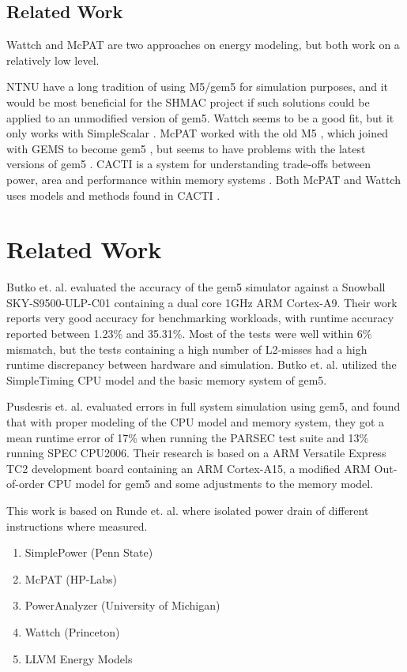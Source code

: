 
\subsection{Related Work}

Wattch \cite{brooks2000wattch} and McPAT \cite{hpmcpat,li2013mcpat} are two
approaches on energy modeling, but both work on a relatively low level.

NTNU have a long tradition of using M5/gem5 for simulation purposes, and it
would be most beneficial for the SHMAC project if such solutions could be
applied to an unmodified version of gem5. Wattch seems to be a good fit, but it
only works with SimpleScalar \cite{wattchanalysis}. McPAT worked with the old M5
\cite{m5mcpatparser}, which joined with GEMS to become gem5 \cite{gem5hipeac},
but seems to have problems with the latest versions of gem5
\cite{mcpatgem5problems}. CACTI is a system for understanding trade-offs between
power, area and performance within memory systems
\cite{hpcacti,muralimanohar2010memory}. Both McPAT and Wattch uses models and
methods found in CACTI \cite{li2009mcpat}.




\section{Related Work}

Butko et. al. \cite{butko2012accuracy} evaluated the accuracy of the gem5
simulator against a Snowball SKY-S9500-ULP-C01 containing a dual core 1GHz ARM
Cortex-A9.  Their work reports very good accuracy for benchmarking workloads,
with runtime accuracy reported between 1.23\% and 35.31\%.  Most of the tests
were well within 6\% mismatch, but the tests containing a high number of
L2-misses had a high runtime discrepancy between hardware and simulation. Butko et. al.
utilized the SimpleTiming CPU model and the basic memory system of gem5.

Pusdesris et. al. \cite{pusdesrissources} evaluated errors in full system
simulation using gem5, and found that with proper modeling of the CPU model
and memory system, they got a mean runtime error of 17\% when running the PARSEC
test suite and 13\% running SPEC CPU2006. Their research is based on a ARM
Versatile Express TC2 development board containing an ARM Cortex-A15, a modified
ARM Out-of-order CPU model for gem5 and some adjustments to the memory model.

This work is based on Runde et. al. \cite{rundehvatum2013exploring} where isolated
power drain of different instructions where measured.

\begin{enumerate}
    \item SimplePower (Penn State)
    \item McPAT (HP-Labs)
    \item PowerAnalyzer (University of Michigan)
    \item Wattch (Princeton)
    \item LLVM Energy Models
\end{enumerate}
